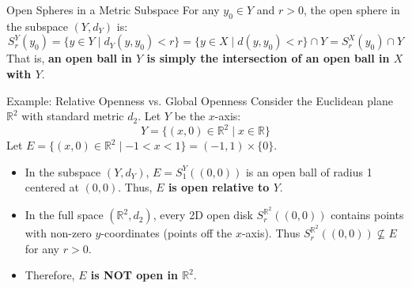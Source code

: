 \documentclass[11pt,a4paper]{article}
\begin{document}
\begin{formulabox}{Open Spheres in a Metric Subspace}
For any $y_0 \in Y$ and $r > 0$, the open sphere in the subspace $(Y, d_Y)$ is:
\begin{equation}
    S_r^Y(y_0) = \{ y \in Y \mid d_Y(y, y_0) < r \} = \{ y \in X \mid d(y, y_0) < r \} \cap Y = S_r^X(y_0) \cap Y
\end{equation}
That is, \textbf{an open ball in $Y$ is simply the intersection of an open ball in $X$ with $Y$}.
\end{formulabox}

\begin{exbox}{Example: Relative Openness vs. Global Openness}
Consider the Euclidean plane $\mathbb{R}^2$ with standard metric $d_2$. Let $Y$ be the $x$-axis:
$$Y = \{ (x, 0) \in \mathbb{R}^2 \mid x \in \mathbb{R} \}$$
Let $E = \{ (x, 0) \in \mathbb{R}^2 \mid -1 < x < 1 \} = (-1, 1) \times \{0\}$.
\begin{itemize}
    \item In the subspace $(Y, d_Y)$, $E = S_1^Y((0,0))$ is an open ball of radius 1 centered at $(0,0)$. Thus, \textbf{$E$ is open relative to $Y$}.
    \item In the full space $(\mathbb{R}^2, d_2)$, every 2D open disk $S_r^{\mathbb{R}^2}((0,0))$ contains points with non-zero $y$-coordinates (points off the $x$-axis). Thus $S_r^{\mathbb{R}^2}((0,0)) \not\subseteq E$ for any $r > 0$.
    \item Therefore, \textbf{$E$ is NOT open in $\mathbb{R}^2$}.
\end{itemize}
\end{exbox}

\begin{center}
\end{center}
\end{document}
